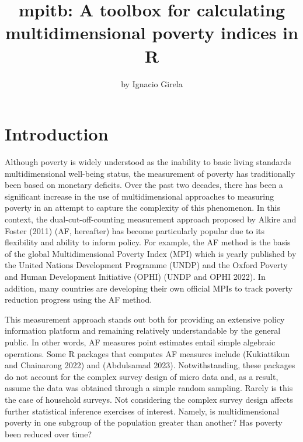 \title{mpitb: A toolbox for calculating multidimensional poverty indices in R}


\author{by Ignacio Girela}

\maketitle


\hypertarget{introduction}{%
\section{Introduction}\label{introduction}}

Although poverty is widely understood as the inability to basic living standards multidimensional well-being status, the measurement of poverty has traditionally been based on monetary deficits. Over the past two decades, there has been a significant increase in the use of multidimensional approaches to measuring poverty in an attempt to capture the complexity of this phenomenon. In this context, the dual-cut-off-counting measurement approach proposed by Alkire and Foster (2011) (AF, hereafter) has become particularly popular due to its flexibility and ability to inform policy. For example, the AF method is the basis of the global Multidimensional Poverty Index (MPI) which is yearly published by the United Nations Development Programme (UNDP) and the Oxford Poverty and Human Development Initiative (OPHI) (UNDP and OPHI 2022). In addition, many countries are developing their own official MPIs to track poverty reduction progress using the AF method.

This measurement approach stands out both for providing an extensive policy information platform and remaining relatively understandable by the general public. In other words, AF measures point estimates entail simple algebraic operations. Some R packages that computes AF measures include  (Kukiattikun and Chainarong 2022) and  (Abdulsamad 2023). Notwithstanding, these packages do not account for the complex survey design of micro data and, as a result, assume the data was obtained through a simple random sampling. Rarely is this the case of household surveys. Not considering the complex survey design affects further statistical inference exercises of interest. Namely, is multidimensional poverty in one subgroup of the population greater than another? Has poverty been reduced over time?

